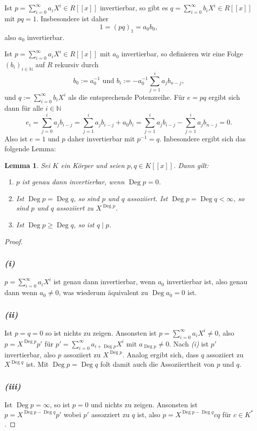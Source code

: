 \documentclass[a4paper,10pt]{article}
\newcounter{satze}
\newtheorem{lem}[satze]{Lemma}
\newcommand{\N}{\mathbb{N}}
\newcommand{\Deg}{\operatorname{Deg}}
\begin{document}
\subsection{}
Ist $p = \sum_{i=0}^\infty a_i X^i \in R[\![x]\!]$ invertierbar, so gibt es $q = \sum_{i=0}^\infty b_i X^i \in R[\![x]\!]$ mit $pq = 1$. Insbesondere ist daher
\[
 1 = (pq)_1 = a_0 b_0,
\]
also $a_0$ invertierbar.

Ist $p = \sum_{i=0}^\infty a_i X^i \in R[\![x]\!]$ mit $a_0$ invertierbar, so definieren wir eine Folge $(b_i)_{i \in \N}$ auf $R$ rekursiv durch
\[
 b_0 := a_0^{-1} \text{ und } b_i := -a_0^{-1} \sum_{j=1}^i a_j b_{n-j},
\]
und $q := \sum_{i=0}^\infty b_i X^i$ als die entsprechende Potenzreihe. Für $e = pq$ ergibt sich dann für alle $i \in \N$
\[
 e_i
 = \sum_{j=0}^i a_j b_{i-j}
 = \sum_{j=1}^i a_j b_{i-j} + a_0 b_i
 = \sum_{j=1}^i a_j b_{i-j} - \sum_{j=1}^i a_j b_{n-j}
 = 0.
\]
Also ist $e = 1$ und $p$ daher invertierbar mit $p^{-1} = q$. Inbesondere ergibt sich das folgende Lemma:

\begin{lem} \label{lem: starkes Lemma}
 Sei $K$ ein Körper und seien $p,q \in K[\![x]\!]$. Dann gilt:
 \begin{enumerate}
  \item $p$ ist genau dann invertierbar, wenn $\Deg p = 0$.
  \item Ist $\Deg p = \Deg q$, so sind $p$ und $q$ assoziiert. Ist $\Deg p = \Deg q < \infty$, so sind $p$ und $q$ assoziiert zu $X^{\Deg p}$.
  \item Ist $\Deg p \geq \Deg q$, so ist $q \mid p$.
 \end{enumerate}
\end{lem}
\begin{proof}
 \subsubsection*{\textit{(i)}}
  $p = \sum_{i=0}^{\infty} a_i X^i$ ist genau dann invertierbar, wenn $a_0$ invertierbar ist, also genau dann wenn $a_0 \neq 0$, was wiederum äquivalent zu $\Deg a_0 = 0$ ist.
 \subsubsection*{\textit{(ii)}}
  Ist $p = q = 0$ so ist nichts zu zeigen. Ansonsten ist $p = \sum_{i=0}^\infty a_i X^i \neq 0$, also $p = X^{\Deg p} p'$ für $p' = \sum_{i=0}^\infty a_{i+\Deg p} X^i$ mit $a_{\Deg p} \neq 0$. Nach \textit{(i)} ist $p'$ invertierbar, also $p$ assoziiert zu $X^{\Deg p}$. Analog ergibt sich, dass $q$ assoziiert zu $X^{\Deg q}$ ist. Mit $\Deg p = \Deg q$ folt damit auch die Assoziiertheit von $p$ und $q$.
 \subsubsection*{\textit{(iii)}}
 Ist $\Deg p = \infty$, so ist $p = 0$ und nichts zu zeigen. Ansonsten ist $p = X^{\Deg p - \Deg q} p'$ wobei $p'$ assozziert zu $q$ ist, also $p = X^{\Deg p - \Deg q} c q$ für $c \in K^*$.
\end{proof}
\end{document}
